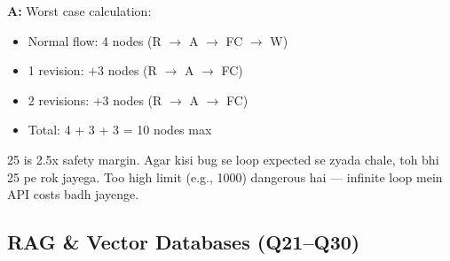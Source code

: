 \documentclass[12pt, a4paper]{article}
\begin{document}
\begin{interviewbox}[title={\faIcon{user-tie} ~Q20: Humara graph ka recursion\_limit 25 kyun hai?}]
\textbf{A:} Worst case calculation:
\begin{itemize}
\item Normal flow: 4 nodes (R $\rightarrow$ A $\rightarrow$ FC $\rightarrow$ W)
\item 1 revision: +3 nodes (R $\rightarrow$ A $\rightarrow$ FC)
\item 2 revisions: +3 nodes (R $\rightarrow$ A $\rightarrow$ FC)
\item Total: 4 + 3 + 3 = 10 nodes max
\end{itemize}

25 is 2.5x safety margin. Agar kisi bug se loop expected se zyada chale, toh bhi 25 pe rok jayega. Too high limit (e.g., 1000) dangerous hai --- infinite loop mein API costs badh jayenge.
\end{interviewbox}

\subsection{RAG \& Vector Databases (Q21--Q30)}
\end{document}
